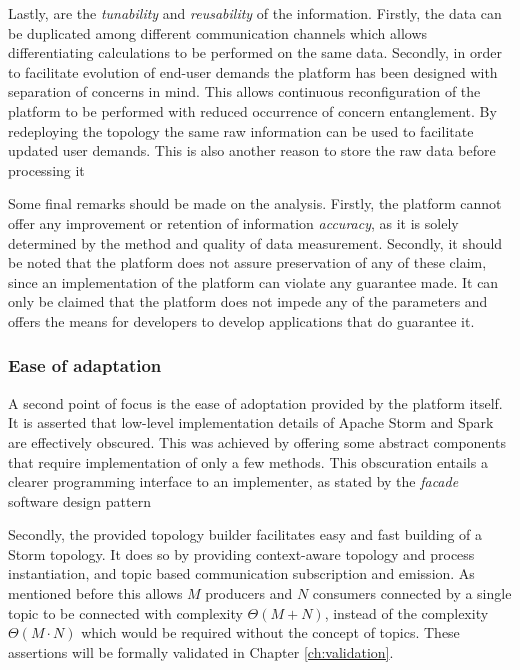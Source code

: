 Lastly, are the \emph{tunability} and \emph{reusability} of the information. Firstly, the data can be duplicated among different communication channels which allows differentiating calculations to be performed on the same data. Secondly, in order to facilitate evolution of end-user demands the platform has been designed with separation of concerns in mind. This allows continuous reconfiguration of the platform to be performed with reduced occurrence of concern entanglement. By redeploying the topology the same raw information can be used to facilitate updated user demands. This is also another reason to store the raw data before processing it

Some final remarks should be made on the analysis. Firstly, the platform cannot offer any improvement or retention of information \emph{accuracy}, as it is solely determined by the method and quality of data measurement. Secondly, it should be noted that the platform does not assure preservation of any of these claim, since an implementation of the platform can violate any guarantee made. It can only be claimed that the platform does not impede any of the parameters and offers the means for developers to develop applications that do guarantee it.

\subsubsection*{Ease of adaptation}
A second point of focus is the ease of adoptation provided by the platform itself. It is asserted that low-level implementation details of Apache Storm and Spark are effectively obscured. This was achieved by offering some abstract components that require implementation of only a few methods. This obscuration entails a clearer programming interface to an implementer, as stated by the \emph{facade} software design pattern \cite{facade_pattern}

Secondly, the provided topology builder facilitates easy and fast building of a Storm topology. It does so by providing context-aware topology and process instantiation, and topic based communication subscription and emission.  As mentioned before this allows $M$ producers and $N$ consumers connected by a single topic to be connected with complexity $\Theta(M+N)$, instead of the complexity $\Theta(M\cdot N)$ which would be required without the concept of topics. These assertions will be formally validated in Chapter \ref{ch:validation}.

